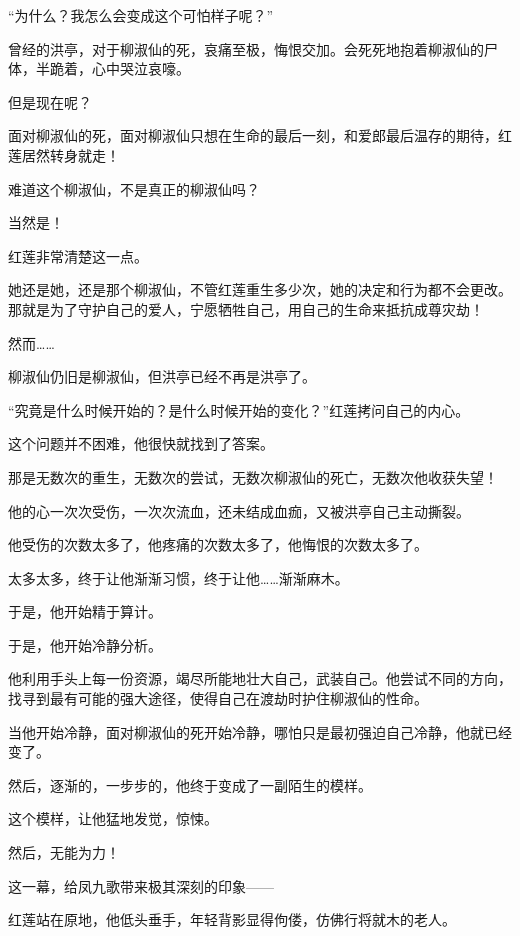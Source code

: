 
\begin{this_body}



“为什么？我怎么会变成这个可怕样子呢？”

曾经的洪亭，对于柳淑仙的死，哀痛至极，悔恨交加。会死死地抱着柳淑仙的尸体，半跪着，心中哭泣哀嚎。

但是现在呢？

面对柳淑仙的死，面对柳淑仙只想在生命的最后一刻，和爱郎最后温存的期待，红莲居然转身就走！

难道这个柳淑仙，不是真正的柳淑仙吗？

当然是！

红莲非常清楚这一点。

她还是她，还是那个柳淑仙，不管红莲重生多少次，她的决定和行为都不会更改。那就是为了守护自己的爱人，宁愿牺牲自己，用自己的生命来抵抗成尊灾劫！

然而……

柳淑仙仍旧是柳淑仙，但洪亭已经不再是洪亭了。

“究竟是什么时候开始的？是什么时候开始的变化？”红莲拷问自己的内心。

这个问题并不困难，他很快就找到了答案。

那是无数次的重生，无数次的尝试，无数次柳淑仙的死亡，无数次他收获失望！

他的心一次次受伤，一次次流血，还未结成血痂，又被洪亭自己主动撕裂。

他受伤的次数太多了，他疼痛的次数太多了，他悔恨的次数太多了。

太多太多，终于让他渐渐习惯，终于让他……渐渐麻木。

于是，他开始精于算计。

于是，他开始冷静分析。

他利用手头上每一份资源，竭尽所能地壮大自己，武装自己。他尝试不同的方向，找寻到最有可能的强大途径，使得自己在渡劫时护住柳淑仙的性命。

当他开始冷静，面对柳淑仙的死开始冷静，哪怕只是最初强迫自己冷静，他就已经变了。

然后，逐渐的，一步步的，他终于变成了一副陌生的模样。

这个模样，让他猛地发觉，惊悚。

然后，无能为力！

这一幕，给凤九歌带来极其深刻的印象——

红莲站在原地，他低头垂手，年轻背影显得佝偻，仿佛行将就木的老人。


\end{this_body}

